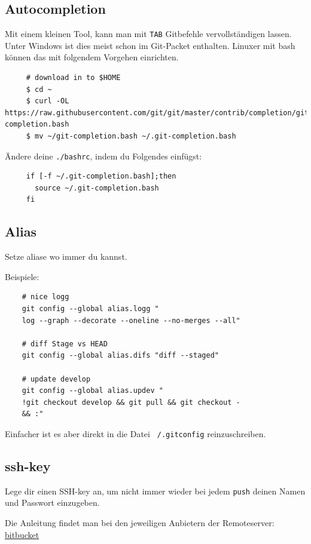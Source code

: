 \documentclass[
   draft=false
  ,paper=a4
  ,twoside=false
  ,fontsize=11pt
  ,headsepline
  ,DIV=11
  ,parskip=full+
  ,titlepage
]{scrartcl} %
\begin{document}
\subsection{Autocompletion}
  Mit einem kleinen Tool, kann man mit \texttt{TAB} Gitbefehle 
  vervollständigen lassen. Unter Windows ist dies meist schon 
  im Git-Packet enthalten. Linuxer mit bash können das mit folgendem 
  Vorgehen einrichten.
  
    \begin{lstlisting}
     # download in to $HOME 
     $ cd ~
     $ curl -OL https://raw.githubusercontent.com/git/git/master/contrib/completion/git-completion.bash
     $ mv ~/git-completion.bash ~/.git-completion.bash
    \end{lstlisting}
    Ändere deine \texttt{./bashrc}, indem du Folgendes einfügst:
    \begin{lstlisting}
     if [-f ~/.git-completion.bash];then
       source ~/.git-completion.bash
     fi
    \end{lstlisting}

\subsection{Alias}
    Setze aliase wo immer du kannst.
    
    Beispiele:
    \begin{lstlisting}
    # nice logg 
    git config --global alias.logg "
    log --graph --decorate --oneline --no-merges --all"
    
    # diff Stage vs HEAD          
    git config --global alias.difs "diff --staged" 
    
    # update develop
    git config --global alias.updev "
    !git checkout develop && git pull && git checkout - 
    && :"                          
    \end{lstlisting}
    Einfacher ist es aber direkt in die Datei \texttt{~/.gitconfig} 
    reinzuschreiben. 
\subsection{ssh-key}

  Lege dir einen SSH-key an, um nicht immer wieder bei jedem \texttt{push}
  deinen Namen und Passwort einzugeben.
  
  Die Anleitung findet man bei den jeweiligen Anbietern der Remoteserver:
  \href{https://confluence.atlassian.com/bitbucket/add-an-ssh-key-to-an-account-302811853.html}{bitbucket}
\end{document}
